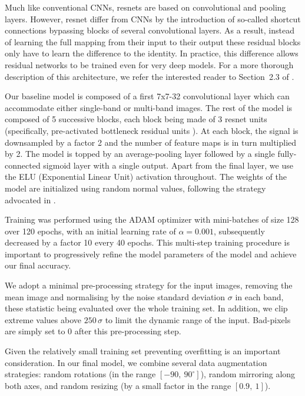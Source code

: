 \documentclass{aa}
\begin{document}
Much like conventional CNNs, resnets are based on convolutional and pooling layers. However, resnet differ from CNNs by the introduction of so-called shortcut connections bypassing blocks of several convolutional layers. As a result, instead of learning the full mapping from their input to their output these residual blocks only have to  learn the difference to the identity. In practice, this difference allows residual networks to be trained even for very deep models. For a more thorough description of this architecture, we refer the interested reader to Section~2.3 of \citet{Lanusse2017}.

Our baseline model is composed of a first 7x7-32 convolutional layer which can accommodate either single-band or multi-band images. The rest of the model is composed of 5 successive blocks, each block being made of 3 resnet units (specifically, pre-activated bottleneck residual units \citep{He2016}). At each block, the signal is downsampled by a factor 2 and the number of feature maps is in turn multiplied by 2. The model is topped by an average-pooling layer followed by a single fully-connected sigmoid layer with a single output. Apart from the final layer, we use the ELU (Exponential Linear Unit) activation throughout. The weights of the model are initialized using random normal values, following the strategy advocated in \citet{He2015a}. 

Training was performed using the ADAM optimizer with mini-batches of size 128 over 120 epochs, with an initial learning rate of $\alpha=0.001$, subsequently decreased by a factor 10 every 40 epochs. This multi-step training procedure is important to progressively refine the model parameters of the model and achieve our final accuracy.

We adopt a minimal pre-processing strategy for the input images, removing the mean image and normalising by the noise standard deviation $\sigma$ in each band, these statistic being evaluated over the whole training set. In addition, we clip extreme values above $250 \,\sigma$ to limit the dynamic range of the input. Bad-pixels are simply set to 0 after this pre-processing step.

Given the relatively small training set preventing overfitting is an important consideration. In our final model, we combine several data augmentation strategies: random rotations (in the range $[-90, \ 90^\circ]$), random mirroring along both axes, and random resizing (by a small factor in the range $[0.9, \ 1]$).
\end{document}
